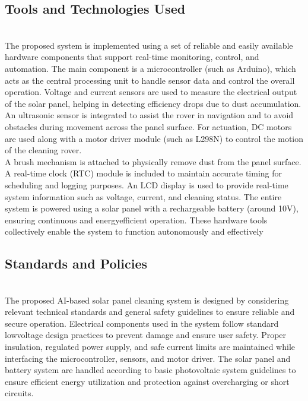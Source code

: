 \documentclass[10pt]{report}
\begin{document}
\begin{sloppypar}
{{{\begin{sloppypar}
\subsection{Tools and Technologies Used}\\
\hspace{0.5cm}
The proposed system is implemented using a set of reliable and easily available
hardware components that support real-time monitoring, control, and automation.
The main component is a microcontroller (such as Arduino), which acts as the central processing unit to handle sensor data and control the overall operation. Voltage
and current sensors are used to measure the electrical output of the solar panel, helping in detecting efficiency drops due to dust accumulation. An ultrasonic sensor is
integrated to assist the rover in navigation and to avoid obstacles during movement
across the panel surface. For actuation, DC motors are used along with a motor
driver module (such as L298N) to control the motion of the cleaning rover.
\\

A brush
mechanism is attached to physically remove dust from the panel surface. 
A real-time
clock (RTC) module is included to maintain accurate timing for scheduling and logging purposes. An LCD display is used to provide real-time system information such
as voltage, current, and cleaning status. The entire system is powered using a solar
panel with a rechargeable battery (around 10V), ensuring continuous and energyefficient operation. These hardware tools collectively enable the system to function
autonomously and effectively
\\

\subsection{Standards and Policies}\\
\hspace{0.5cm}
The proposed AI-based solar panel cleaning system is designed by considering relevant technical standards and general safety guidelines to ensure reliable and
secure operation. Electrical components used in the system follow standard lowvoltage design practices to prevent damage and ensure user safety. Proper insulation,
regulated power supply, and safe current limits are maintained while interfacing the
microcontroller, sensors, and motor driver. The solar panel and battery system are
handled according to basic photovoltaic system guidelines to ensure efficient energy
utilization and protection against overcharging or short circuits. 
\\


\end{sloppypar}}}}
\end{sloppypar}
\end{document}
